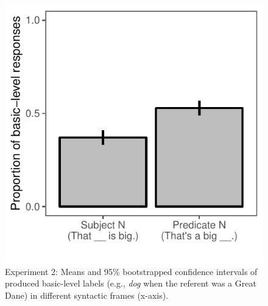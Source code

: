 \documentclass[10pt,letterpaper]{article}
\begin{document}
\begin{figure}[t]
\begin{center}
\includegraphics[width=0.7\linewidth]{expt-np-prod-prereg-bars-revised.pdf}
\end{center}
\vspace{-1cm}
\caption{Experiment 2: Means and 95\% bootstrapped confidence intervals of produced basic-level labels (e.g., \emph{dog} when the referent was a Great Dane) in different syntactic frames (x-axis).}
\label{np-production}
\vspace{-0.2cm}
\end{figure}
\end{document}
